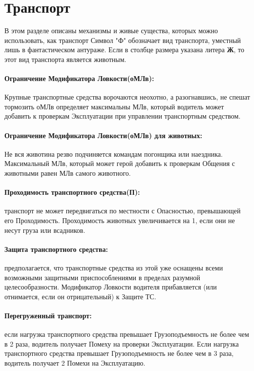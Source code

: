 \section{Транспорт}
В этом разделе описаны механизмы и живые существа, которых можно использовать, как транспорт
\newline Символ "Ф" обозначает вид транспорта, уместный лишь в фантастическом антураже.
\newline Если в столбце размера указана литера \textbf{Ж}, то этот вид транспорта является животным.
\paragraph{Ограничение Модификатора Ловкости(оМЛв):} Крупные транспортные средства ворочаются неохотно, а разогнавшись, не спешат тормозить оМЛв определяет максимальны МЛв, который водитель может добавить к проверкам Эксплуатации при управлении транспортным средством.
\paragraph{Ограничение Модификатора Ловкости(оМЛв) для животных:} Не вся животина резво подчиняется командам погонщика или наездника. Максимальный МЛв, который может герой добавить к проверкам Общения с животными равен МЛв самого животного.
\paragraph{Проходимость транспортного средства(П):} транспорт не может передвигаться по местности с Опасностью, превышающей его Проходимость. Проходимость животных увеличивается на 1, если они не несут груза или всадников.
\paragraph{Защита транспортного средства:} предполагается, что транспортные средства из этой уже оснащены всеми возможными защитными приспособлениями в пределах разумной целесообразности. Модификатор Ловкости водителя прибавляется (или отнимается, если он отрицательный) к Защите ТС.
\paragraph{Перегруженный транспорт:} если нагрузка транспортного средства превышает Грузоподъемность не более чем в 2 раза, водитель получает Помеху на проверки Эксплуатации. Если нагрузка транспортного средства превышает Грузоподъемность не более чем в 3 раза, водитель получает 2 Помехи на Эксплуатацию.
